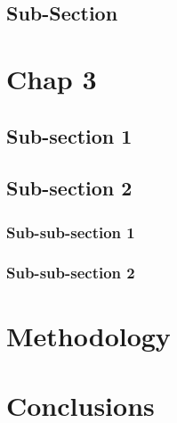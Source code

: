 \documentclass[11pt]{article}
\begin{document}
\subsection{Sub-Section}


\section{Chap 3}

\subsection{Sub-section 1}

\subsection{Sub-section 2}

\subsubsection{Sub-sub-section 1}

\subsubsection{Sub-sub-section 2}

\section{Methodology}





\section{Conclusions}

\listoffigures

\printbibliography
\end{document}
